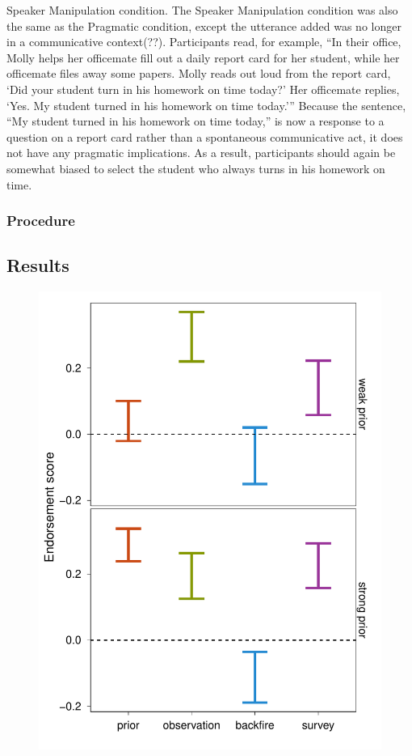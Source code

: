 \documentclass[10pt,letterpaper]{article}
\begin{document}
Speaker Manipulation condition.  The Speaker Manipulation condition was also the same as the Pragmatic condition, except the utterance added was no longer in a communicative context(??).  Participants read, for example, “In their office, Molly helps her officemate fill out a daily report card for her student, while her officemate files away some papers.  Molly reads out loud from the report card, ‘Did your student turn in his homework on time today?’  Her officemate replies, ‘Yes. My student turned in his homework on time today.’”  Because the sentence, “My student turned in his homework on time today,” is now a response to a question on a report card rather than a spontaneous communicative act, it does not have any pragmatic implications.  As a result, participants should again be somewhat biased to select the student who always turns in his homework on time.

\subsubsection{Procedure}

\subsection{Results}



\begin{figure}
\centering
    \includegraphics[width=\columnwidth]{fc2-score-medSplit}
    \caption{}
  \label{fig:expt1score}
\end{figure}
\end{document}
